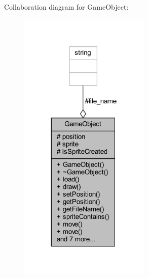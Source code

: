 Collaboration diagram for Game\+Object\+:\nopagebreak
\begin{figure}[H]
\begin{center}
\leavevmode
\includegraphics[width=177pt]{class_game_object__coll__graph}
\end{center}
\end{figure}
